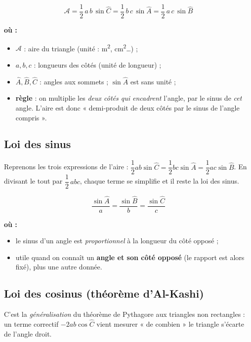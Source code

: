 \documentclass[11pt,a4paper]{article}
\newenvironment{ou}{%
  \par\smallskip\noindent\textbf{où :}\nopagebreak
  \begin{itemize}[leftmargin=1.8em,topsep=2pt,itemsep=1.5pt,parsep=0pt]}%
  {\end{itemize}}
\begin{document}
\begin{formule}
\[
\boxed{\;\mathcal{A}=\frac{1}{2}\,a\,b\,\sin\hat C=\frac{1}{2}\,b\,c\,\sin\hat A=\frac{1}{2}\,a\,c\,\sin\hat B\;}
\]
\begin{ou}
  \item $\mathcal{A}$ : aire du triangle (unité : \si{\metre\squared}, \si{\centi\metre\squared}\dots) ;
  \item $a,b,c$ : longueurs des côtés (unité de longueur) ;
  \item $\hat A,\hat B,\hat C$ : angles aux sommets ; $\sin\hat A$ est sans unité ;
  \item \textbf{règle} : on multiplie les \emph{deux côtés qui encadrent} l'angle, par le sinus de
        \emph{cet} angle. L'aire est donc « demi-produit de deux côtés par le sinus de l'angle compris ».
\end{ou}
\end{formule}

\subsection{Loi des sinus}
Reprenons les trois expressions de l'aire : $\dfrac12 ab\sin\hat C=\dfrac12 bc\sin\hat A=\dfrac12 ac\sin\hat B$.
En divisant le tout par $\dfrac12\,abc$, chaque terme se simplifie et il reste la loi des sinus.

\begin{formule}
\[
\boxed{\;\frac{\sin\hat A}{a}=\frac{\sin\hat B}{b}=\frac{\sin\hat C}{c}\;}
\]
\begin{ou}
  \item le sinus d'un angle est \emph{proportionnel} à la longueur du côté opposé ;
  \item utile quand on connaît un \textbf{angle et son côté opposé} (le rapport est alors fixé),
        plus une autre donnée.
\end{ou}
\end{formule}

\subsection{Loi des cosinus (théorème d'Al-Kashi)}
C'est la \emph{généralisation} du théorème de Pythagore aux triangles non rectangles : un terme
correctif $-2ab\cos\hat C$ vient mesurer « de combien » le triangle s'écarte de l'angle droit.
\end{document}
